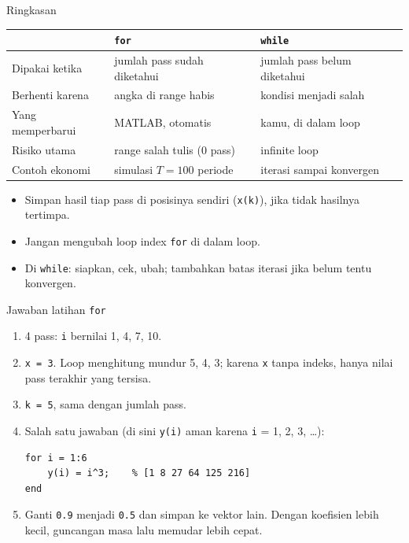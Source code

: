 \documentclass[aspectratio=169,11pt]{beamer}
\begin{document}
\begin{frame}{Ringkasan}
\centering\small
\renewcommand{\arraystretch}{1.3}
\begin{tabular}{l l l}
\toprule
 & \texttt{for} & \texttt{while} \\
\midrule
Dipakai ketika & jumlah pass sudah diketahui & jumlah pass belum diketahui \\
Berhenti karena & angka di range habis & kondisi menjadi salah \\
Yang memperbarui & MATLAB, otomatis & kamu, di dalam loop \\
Risiko utama & range salah tulis (0 pass) & infinite loop \\
Contoh ekonomi & simulasi $T = 100$ periode & iterasi sampai konvergen \\
\bottomrule
\end{tabular}

\vspace{0.8em}
\raggedright
\begin{itemize}
  \item Simpan hasil tiap pass di posisinya sendiri (\texttt{x(k)}), jika
        tidak hasilnya \alert{tertimpa}.
  \item Jangan mengubah loop index \texttt{for} di dalam loop.
  \item Di \texttt{while}: \alert{siapkan, cek, ubah}; tambahkan batas iterasi
        jika belum tentu konvergen.
\end{itemize}
\end{frame}

\begin{frame}[fragile]{Jawaban latihan \texttt{for}}

\begin{enumerate}\small
  \item 4 pass: \texttt{i} bernilai 1, 4, 7, 10.
  \item \texttt{x = 3}. Loop menghitung mundur 5, 4, 3; karena \texttt{x}
        tanpa indeks, hanya nilai pass terakhir yang tersisa.
  \item \texttt{k = 5}, sama dengan jumlah pass.
  \item Salah satu jawaban (di sini \texttt{y(i)} aman karena \texttt{i} =
        1, 2, 3, \dots):
\begin{lstlisting}[basicstyle=\ttfamily\scriptsize]
for i = 1:6
    y(i) = i^3;    % [1 8 27 64 125 216]
end
\end{lstlisting}
  \item Ganti \texttt{0.9} menjadi \texttt{0.5} dan simpan ke vektor lain.
        Dengan koefisien lebih kecil, guncangan masa lalu memudar lebih cepat.
\end{enumerate}
\end{frame}
\end{document}
